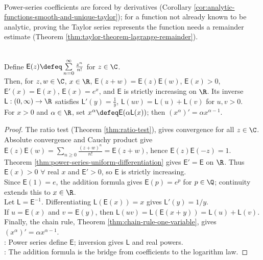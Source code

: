 \begin{perspective} \label{per:taylor-coefficients-need-a-remainder} \\
Power-series coefficients are forced by derivatives (Corollary \ref{cor:analytic-functions-smooth-and-unique-taylor}); for a function not already known to be analytic, proving the Taylor series represents the function needs a remainder estimate (Theorem \ref{thm:taylor-theorem-lagrange-remainder}).
\end{perspective}

\begin{theorem} \label{thm:exponential-logarithm-from-power-series} \\
Define $\mathsf{E}(z)\defeq\sum\limits_{n=0}^{\infty}\frac{z^n}{n!}$ for $z\in\C$.\\
Then, for $z,w\in\C$, $x\in\R$, $\mathsf{E}(z+w)=\mathsf{E}(z)\mathsf{E}(w)$, $\mathsf{E}(x)>0$, $\mathsf{E}'(x)=\mathsf{E}(x)$, $\mathsf{E}(x)=e^x$, and $\mathsf{E}$ is strictly increasing on $\R$. Its inverse $\mathsf{L}:(0,\infty)\to\R$ satisfies $\mathsf{L}'(y)=\frac1y$, $\mathsf{L}(uv)=\mathsf{L}(u)+\mathsf{L}(v)$ for $u,v>0$.\\
For $x>0$ and $\alpha\in\R$, set $x^\alpha\defeq \mathsf{E}(\alpha \mathsf{L}(x))$; then $(x^\alpha)'=\alpha x^{\alpha-1}$.
\begin{proof}
The ratio test (Theorem \ref{thm:ratio-test}), gives convergence for all $z\in\C$.\\
Absolute convergence and Cauchy product give $\mathsf{E}(z)\mathsf{E}(w)=\sum\limits_{n\ge0}\frac{(z+w)^n}{n!}=\mathsf{E}(z+w)$, hence $\mathsf{E}(z)\mathsf{E}(-z)=1$.\\
Theorem \ref{thm:power-series-uniform-differentiation} gives $\mathsf{E}'=\mathsf{E}$ on $\R$. Thus $\mathsf{E}(x)>0$ $\forall$ real $x$ and $\mathsf{E}'>0$, so $\mathsf{E}$ is strictly increasing.\\
Since $\mathsf{E}(1)=e$, the addition formula gives $\mathsf{E}(p)=e^p$ for $p\in\Q$; continuity extends this to $x\in\R$.\\
Let $\mathsf{L}=\mathsf{E}^{-1}$. Differentiating $\mathsf{L}(\mathsf{E}(x))=x$ gives $\mathsf{L}'(y)=1/y$.\\
If $u=\mathsf{E}(x)$ and $v=\mathsf{E}(y)$, then $\mathsf{L}(uv)=\mathsf{L}(\mathsf{E}(x+y))=\mathsf{L}(u)+\mathsf{L}(v)$.\\
Finally, the chain rule, Theorem \ref{thm:chain-rule-one-variable}, gives $(x^\alpha)'=\alpha x^{\alpha-1}$.\\
: Power series define $\mathsf{E}$; inversion gives $\mathsf{L}$ and real powers.\\
: The addition formula is the bridge from coefficients to the logarithm law.
\end{proof}
\end{theorem}


